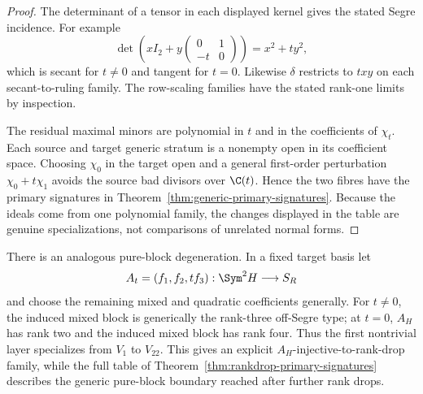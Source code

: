 \begin{proof}
The determinant of a tensor in each displayed kernel gives the stated
Segre incidence.  For example
\[
 \det\left(xI_2+y\begin{pmatrix}0&1\\-t&0\end{pmatrix}\right)
 =x^2+t y^2,
\]
which is secant for \(t\ne0\) and tangent for \(t=0\).  Likewise
\(\delta\) restricts to \(txy\) on each secant-to-ruling family.
The row-scaling families have the stated rank-one limits by inspection.

The residual maximal minors are polynomial in \(t\) and in the
coefficients of \(\chi_t\).  Each source and target generic stratum
is a nonempty open in its coefficient space.  Choosing
\(\chi_0\) in the target open and a general first-order perturbation
\(\chi_0+t\chi_1\) avoids the source bad divisors over
\(\C(t)\).  Hence the two fibres have the primary signatures in
Theorem~\ref{thm:generic-primary-signatures}.  Because the ideals
come from one polynomial family, the changes displayed in the table
are genuine specializations, not comparisons of unrelated normal
forms.
\end{proof}

There is an analogous pure-block degeneration.  In a fixed target
basis let
\[
 A_t=(f_1,f_2,t f_3):\Sym^2H\longrightarrow S_R
\]
and choose the remaining mixed and quadratic coefficients generally.
For \(t\ne0\), the induced mixed block is generically the rank-three
off-Segre type; at \(t=0\), \(A_H\) has rank two and the induced
mixed block has rank four.  Thus the first nontrivial layer specializes
from \(V_1\) to \(V_{22}\).  This gives an explicit
\(A_H\)-injective-to-rank-drop family, while the full table of
Theorem~\ref{thm:rankdrop-primary-signatures} describes the generic
pure-block boundary reached after further rank drops.
